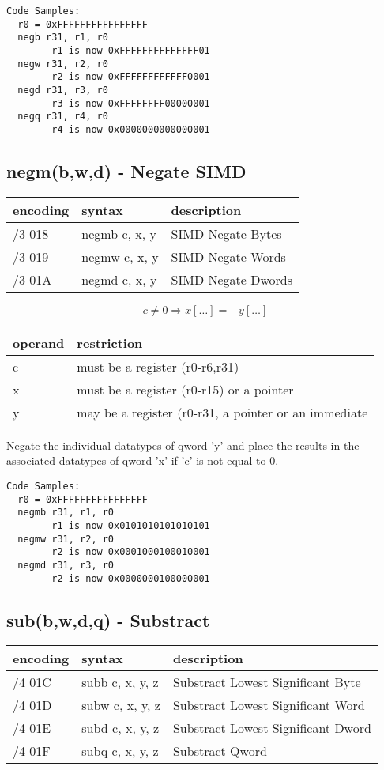 \documentclass[letterpaper,10pt,openright,twoside,onecolumn]{book}
\begin{document}
  \begin{verbatim}
Code Samples:
  r0 = 0xFFFFFFFFFFFFFFFF
  negb r31, r1, r0 
        r1 is now 0xFFFFFFFFFFFFFF01
  negw r31, r2, r0
        r2 is now 0xFFFFFFFFFFFF0001
  negd r31, r3, r0
        r3 is now 0xFFFFFFFF00000001
  negq r31, r4, r0
        r4 is now 0x0000000000000001
  \end{verbatim}
\newpage\subsection{negm(b,w,d) - Negate SIMD}
  \begin{tabular}{|l|l|l|}
   \hline
    encoding & syntax & description \\
   \hline
    /3 018 & negmb c, x, y & SIMD Negate Bytes \\
    /3 019 & negmw c, x, y & SIMD Negate Words \\
    /3 01A & negmd c, x, y & SIMD Negate Dwords \\
   \hline
  \end{tabular}

  \begin{displaymath} c \neq 0 \Rightarrow x[\ldots] = -y[\ldots]\end{displaymath}

  \flushleft
  \begin{tabular}{|l|l|}
   \hline
    operand & restriction \\
   \hline
    c & must be a register (r0-r6,r31) \\
    x & must be a register (r0-r15) or a pointer \\
    y & may be a register (r0-r31, a pointer or an immediate \\
   \hline
  \end{tabular}

  Negate the individual datatypes of qword 'y' and place the results
  in the associated datatypes of qword 'x' if 'c' is not equal to 0.

  \begin{verbatim}
Code Samples:
  r0 = 0xFFFFFFFFFFFFFFFF
  negmb r31, r1, r0
        r1 is now 0x0101010101010101
  negmw r31, r2, r0
        r2 is now 0x0001000100010001
  negmd r31, r3, r0
        r2 is now 0x0000000100000001
  \end{verbatim}
\newpage\subsection{sub(b,w,d,q) - Substract}
  \begin{tabular}{|l|l|l|}
   \hline
    encoding & syntax & description \\
   \hline
    /4 01C & subb c, x, y, z & Substract Lowest Significant Byte \\
    /4 01D & subw c, x, y, z & Substract Lowest Significant Word \\
    /4 01E & subd c, x, y, z & Substract Lowest Significant Dword \\
    /4 01F & subq c, x, y, z & Substract Qword \\
   \hline
  \end{tabular}
\end{document}
